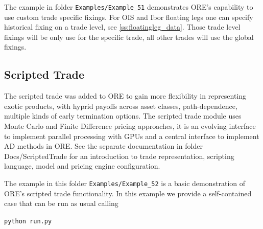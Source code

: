\documentclass[12pt, a4paper]{article}
\begin{document}
The example in folder {\tt Examples/Example\_51} demonstrates ORE's capability to use custom trade specific fixings. For OIS and Ibor floating legs one can specify historical fixing on a trade level, see \ref{ss:floatingleg_data}. Those trade level fixings will be only use for the specific trade, all other trades will use the global fixings.

\subsection{Scripted Trade}%
\label{example:52}

The scripted trade was added to ORE to gain more flexibility in representing exotic products, with hyprid payoffs across
asset classes, path-dependence, multiple kinds of early termination options. The scripted trade module uses Monte Carlo and
Finite Difference pricing approaches, it is an evolving interface to implement parallel processing with GPUs and a central
interface to implement AD methods in ORE. See the separate documentation in folder Docs/ScriptedTrade for an introduction to trade
representation, scripting language, model and pricing engine configuration. 

\medskip
The example in this folder {\tt Examples/Example\_52} is a basic demonstration of ORE's scripted trade functionality.
In this example we provide a self-contained case that can be run as usual calling

\medskip
\centerline{\tt python run.py}

\medskip
\end{document}
